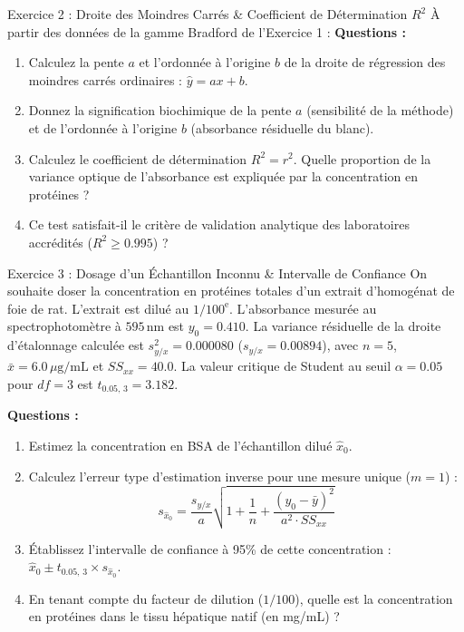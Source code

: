 \documentclass[11pt,a4paper]{article}
\begin{document}
\begin{exercicebox}{Exercice 2 : Droite des Moindres Carrés \& Coefficient de Détermination $R^2$}
À partir des données de la gamme Bradford de l'Exercice 1 :
\textbf{Questions :}
\begin{enumerate}[label=\textbf{\alph*.}]
  \item Calculez la pente $a$ et l'ordonnée à l'origine $b$ de la droite de régression des moindres carrés ordinaires : $\hat{y} = ax + b$.
  \item Donnez la signification biochimique de la pente $a$ (sensibilité de la méthode) et de l'ordonnée à l'origine $b$ (absorbance résiduelle du blanc).
  \item Calculez le coefficient de détermination $R^2 = r^2$. Quelle proportion de la variance optique de l'absorbance est expliquée par la concentration en protéines ?
  \item Ce test satisfait-il le critère de validation analytique des laboratoires accrédités ($R^2 \ge 0.995$) ?
\end{enumerate}
\end{exercicebox}

\begin{exercicebox}{Exercice 3 : Dosage d'un Échantillon Inconnu \& Intervalle de Confiance}
On souhaite doser la concentration en protéines totales d'un extrait d'homogénat de foie de rat.
L'extrait est dilué au $1/100^{\text{e}}$. L'absorbance mesurée au spectrophotomètre à $595\,\text{nm}$ est $y_0 = 0.410$.
La variance résiduelle de la droite d'étalonnage calculée est $s_{y/x}^2 = 0.000080$ ($s_{y/x} = 0.00894$), avec $n = 5$, $\bar{x} = 6.0\,\mu\text{g/mL}$ et $SS_{xx} = 40.0$.
La valeur critique de Student au seuil $\alpha = 0.05$ pour $df = 3$ est $t_{0.05, \, 3} = 3.182$.

\textbf{Questions :}
\begin{enumerate}[label=\textbf{\alph*.}]
  \item Estimez la concentration en BSA de l'échantillon dilué $\hat{x}_0$.
  \item Calculez l'erreur type d'estimation inverse pour une mesure unique ($m = 1$) :
  \begin{equation*}
    s_{\hat{x}_0} = \frac{s_{y/x}}{a} \sqrt{1 + \frac{1}{n} + \frac{(y_0 - \bar{y})^2}{a^2 \cdot SS_{xx}}}
  \end{equation*}
  \item Établissez l'intervalle de confiance à 95\% de cette concentration : $\hat{x}_0 \pm t_{0.05, \, 3} \times s_{\hat{x}_0}$.
  \item En tenant compte du facteur de dilution ($1/100$), quelle est la concentration en protéines dans le tissu hépatique natif (en mg/mL) ?
\end{enumerate}
\end{exercicebox}
\end{document}
